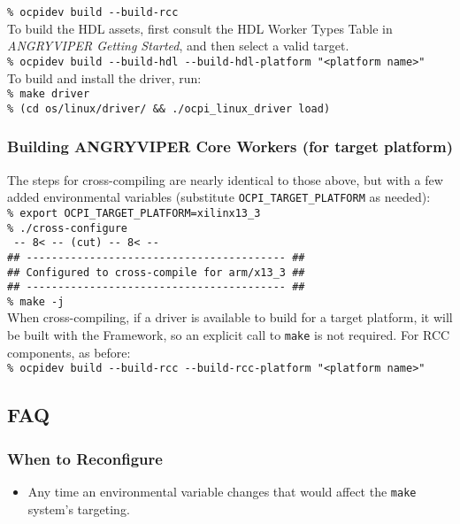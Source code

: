 \begin{appendices}
\verb+% ocpidev build --build-rcc+\\

To build the HDL assets, first consult the HDL Worker Types Table in \textit{ANGRYVIPER Getting Started}, and then select a valid target. \\

\verb+% ocpidev build --build-hdl --build-hdl-platform "<platform name>"+\\

To build and install the driver, run:\\

\verb+% make driver+ \\
\verb+% (cd os/linux/driver/ && ./ocpi_linux_driver load)+

\subsubsection{Building ANGRYVIPER Core Workers (for target platform)}
The steps for cross-compiling are nearly identical to those above, but with a few added environmental variables (substitute \verb+OCPI_TARGET_PLATFORM+ as needed):\\

\verb+% export OCPI_TARGET_PLATFORM=xilinx13_3+\\
\verb+% ./cross-configure+\\
\verb+ -- 8< -- (cut) -- 8< --+\\
\verb+## ----------------------------------------- ##+\\
\verb+## Configured to cross-compile for arm/x13_3 ##+\\
\verb+## ----------------------------------------- ##+\\
\verb+% make -j+\\

When cross-compiling, if a driver is available to build for a target platform, it will be built with the Framework, so an explicit call to \texttt{make} is not required. For RCC components, as before:\\

\verb+% ocpidev build --build-rcc --build-rcc-platform "<platform name>"+

\subsection{FAQ}
\subsubsection{When to Reconfigure}
\begin{itemize}
\item Any time an environmental variable changes that would affect the \texttt{make} system's targeting.
\end{itemize}


\end{appendices}
